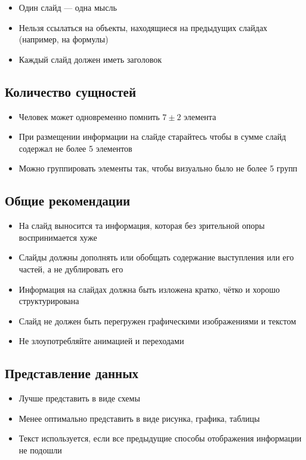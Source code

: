 \documentclass[
  letterpaper,
  DIV=11,
  numbers=noendperiod]{scrartcl}
\providecommand{\tightlist}{%
  \setlength{\itemsep}{0pt}\setlength{\parskip}{0pt}}\usepackage{longtable,booktabs,array}
\begin{document}
\begin{itemize}
\tightlist
\item
  Один слайд --- одна мысль
\item
  Нельзя ссылаться на объекты, находящиеся на предыдущих слайдах
  (например, на формулы)
\item
  Каждый слайд должен иметь заголовок
\end{itemize}

\subsection{Количество
сущностей}\label{ux43aux43eux43bux438ux447ux435ux441ux442ux432ux43e-ux441ux443ux449ux43dux43eux441ux442ux435ux439}

\begin{itemize}
\tightlist
\item
  Человек может одновременно помнить \(7 \pm 2\) элемента
\item
  При размещении информации на слайде старайтесь чтобы в сумме слайд
  содержал не более 5 элементов
\item
  Можно группировать элементы так, чтобы визуально было не более 5 групп
\end{itemize}

\subsection{Общие
рекомендации}\label{ux43eux431ux449ux438ux435-ux440ux435ux43aux43eux43cux435ux43dux434ux430ux446ux438ux438}

\begin{itemize}
\tightlist
\item
  На слайд выносится та информация, которая без зрительной опоры
  воспринимается хуже
\item
  Слайды должны дополнять или обобщать содержание выступления или его
  частей, а не дублировать его
\item
  Информация на слайдах должна быть изложена кратко, чётко и хорошо
  структурирована
\item
  Слайд не должен быть перегружен графическими изображениями и текстом
\item
  Не злоупотребляйте анимацией и переходами
\end{itemize}

\subsection{Представление
данных}\label{ux43fux440ux435ux434ux441ux442ux430ux432ux43bux435ux43dux438ux435-ux434ux430ux43dux43dux44bux445}

\begin{itemize}
\tightlist
\item
  Лучше представить в виде схемы
\item
  Менее оптимально представить в виде рисунка, графика, таблицы
\item
  Текст используется, если все предыдущие способы отображения информации
  не подошли
\end{itemize}
\end{document}
